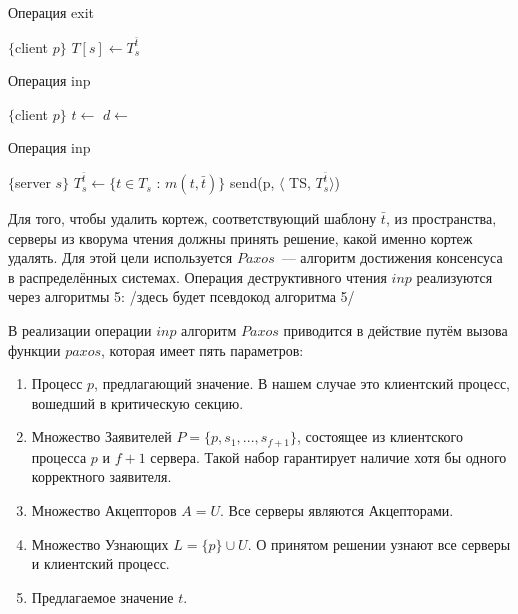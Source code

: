 \begin{algorithm}[H]
	\caption{Операция exit}\label{alg6}
	\begin{algorithmic}[1]
		\Statex $\{$client $p \}$
		\State {}
		\State $T[s] \gets T_s^{\bar t}$
		\EndFor
		\EndProcedure
	\end{algorithmic}
\end{algorithm}

\begin{algorithm}[H]
	\caption{Операция inp}\label{alg7}
	\begin{algorithmic}[1]
		\Statex $\{$client $p \}$
		\Repeat
			\State $t \gets$ 
				\State {}
				\State \Return{$\perp$}
			\EndIf
			\State $d \gets$ 
			\State {}
		\State {}
		\EndFunction
	\end{algorithmic}
\end{algorithm}


\begin{algorithm}[H]
	\caption{Операция inp}\label{alg8}
	\begin{algorithmic}[1]
		\Statex $\{$server $s \}$
		\State $T_s^{\bar t} \gets \{t \in T_s$ : $m(t, \bar t)\}$
		\State send(p, $\langle$ TS, $T_s^{\bar t}\rangle$)
		\EndUpon
	\end{algorithmic}
\end{algorithm}

Для того, чтобы удалить кортеж, соответствующий шаблону $\bar{t}$, из пространства, серверы из кворума чтения должны принять решение, какой именно кортеж удалять. Для этой цели используется $Paxos$~--- алгоритм достижения консенсуса в распределённых системах. Операция деструктивного чтения $inp$ реализуются через алгоритмы 5: /здесь будет псевдокод алгоритма 5/

В реализации операции $inp$ алгоритм $Paxos$ приводится в действие путём вызова функции $paxos$, которая имеет пять параметров: 
\begin{enumerate}
	\item Процесс $p$, предлагающий значение. В нашем случае это клиентский процесс, вошедший в критическую секцию.
	\item Множество Заявителей $P = \{p, s_1, ..., s_{f+1}\}$, состоящее из клиентского процесса $p$ и $f + 1$ сервера. Такой набор гарантирует наличие хотя бы одного корректного заявителя.
	\item Множество Акцепторов $A = U$. Все серверы являются Акцепторами.
	\item Множество Узнающих $L = \{p\} \cup U$. О принятом решении узнают все серверы и клиентский процесс.
	\item Предлагаемое значение $t$.
\end{enumerate}

